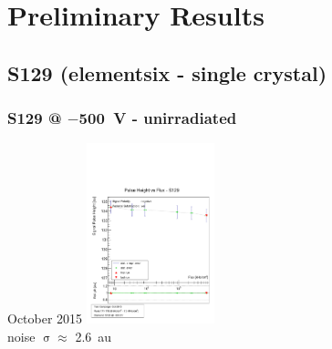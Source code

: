 \documentclass[9pt]{beamer}
\begin{document}
\section{Preliminary Results}
\subsection{S129 (elementsix - single crystal)}
\begin{frame}
	\frametitle{S129 @ $-$\SI{500}{V} - unirradiated}
	\def \sp {3.7cm}
	\begin{minipage}{\sp}
		\centering
		October 2015 
		\includegraphics[width=\sp]{CPH1608_03}\\
		noise $\upsigma\approx$ \SI{2.6}{au}
	\end{minipage}
	\hspace*{2pt}
	\begin{minipage}{\sp}

\end{minipage}
\end{frame}
\end{document}
